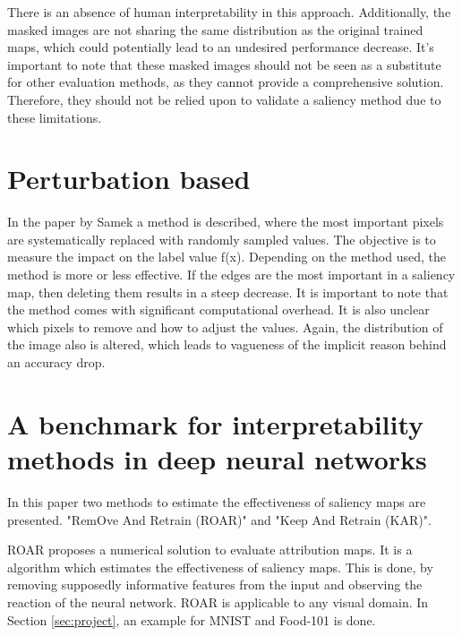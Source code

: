 There is an absence of human interpretability in this approach. Additionally, the masked images are not sharing the same distribution as the original trained maps, which could potentially lead to an undesired performance decrease. It's important to note that these masked images should not be seen as a substitute for other evaluation methods, as they cannot provide a comprehensive solution. Therefore, they should not be relied upon to validate a saliency method due to these limitations.

\section{Perturbation based}
\label{pertubation}

In the paper by Samek\cite{samek2017} a method is described, where the most important pixels are systematically replaced with randomly sampled values. The objective is to measure the impact on the label value f(x). Depending on the method used, the method is more or less effective. If the edges are the most important in a saliency map, then deleting them results in a steep decrease.
It is important to note that the method comes with significant computational overhead. It is also unclear which pixels to remove and how to adjust the values. Again, the distribution of the image also is altered, which leads to vagueness of the implicit reason behind an accuracy drop.

\section{A benchmark for interpretability methods in deep neural networks }

In this paper \cite{hooker2019benchmark} two methods to estimate the effectiveness of saliency maps are presented. "RemOve And Retrain (ROAR)" and "Keep And Retrain (KAR)". 

ROAR proposes a numerical solution to evaluate attribution maps. It is a algorithm which estimates the effectiveness of saliency maps. This is done, by removing supposedly informative features from the input and observing the reaction of the neural network. ROAR is applicable to any visual domain. In Section \ref{sec:project}, an example for MNIST and Food-101 is done.


